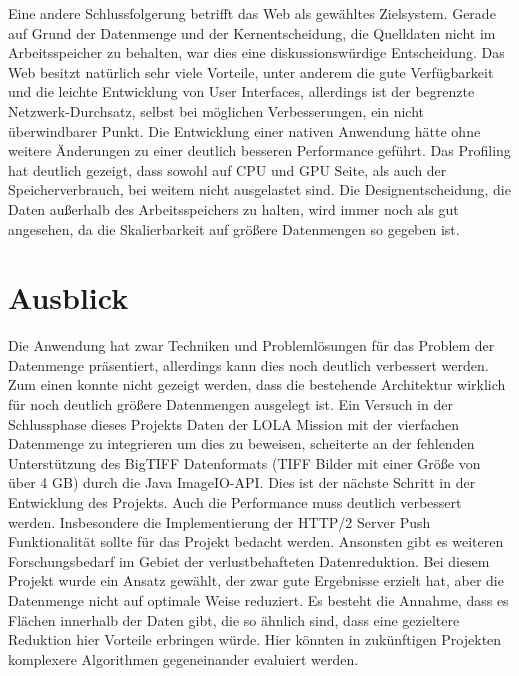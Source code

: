 Eine andere Schlussfolgerung betrifft das Web als gewähltes Zielsystem. Gerade auf Grund der Datenmenge und der Kernentscheidung, die Quelldaten nicht im Arbeitsspeicher zu behalten, war dies eine diskussionswürdige Entscheidung. Das Web besitzt natürlich sehr viele Vorteile, unter anderem die gute Verfügbarkeit und die leichte Entwicklung von User Interfaces, allerdings ist der begrenzte Netzwerk-Durchsatz, selbst bei möglichen Verbesserungen, ein nicht überwindbarer Punkt. Die Entwicklung einer nativen Anwendung hätte ohne weitere Änderungen zu einer deutlich besseren Performance geführt. Das Profiling hat deutlich gezeigt, dass sowohl auf CPU und GPU Seite, als auch der Speicherverbrauch, bei weitem nicht ausgelastet sind. Die Designentscheidung, die Daten außerhalb des Arbeitsspeichers zu halten, wird immer noch als gut angesehen, da die Skalierbarkeit auf größere Datenmengen so gegeben ist.

\section{Ausblick}
Die Anwendung hat zwar Techniken und Problemlösungen für das Problem der Datenmenge präsentiert, allerdings kann dies noch deutlich verbessert werden. Zum einen konnte nicht gezeigt werden, dass die bestehende Architektur wirklich für noch deutlich größere Datenmengen ausgelegt ist. Ein Versuch in der Schlussphase dieses Projekts Daten der LOLA Mission mit der vierfachen Datenmenge zu integrieren um dies zu beweisen, scheiterte an der fehlenden Unterstützung des BigTIFF Datenformats (TIFF Bilder mit einer Größe von über 4 GB) durch die Java ImageIO-API. Dies ist der nächste Schritt in der Entwicklung des Projekts. Auch die Performance muss deutlich verbessert werden. Insbesondere die Implementierung der HTTP/2 Server Push Funktionalität sollte für das Projekt bedacht werden. Ansonsten gibt es weiteren Forschungsbedarf im Gebiet der verlustbehafteten Datenreduktion. Bei diesem Projekt wurde ein Ansatz gewählt, der zwar gute Ergebnisse erzielt hat, aber die Datenmenge nicht auf optimale Weise reduziert. Es besteht die Annahme, dass es Flächen innerhalb der Daten gibt, die so ähnlich sind, dass eine gezieltere Reduktion hier Vorteile erbringen würde. Hier könnten in zukünftigen Projekten komplexere Algorithmen gegeneinander evaluiert werden.